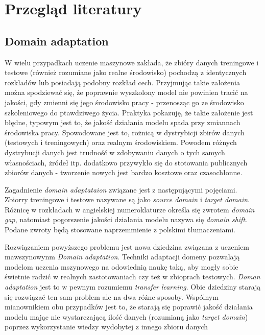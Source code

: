 
\chapter{Przegląd literatury}
    \justify    
    \section{Domain adaptation}
            W wielu przypadkach uczenie maszynowe zakłada, że zbióry danych treningowe i testowe (również rozumiane jako realne środowisko) pochodzą
        z identycznych rozkładów lub posiadają podobny rozkład cech. Przyjmując takie założenia można spodziewać się, że poprawnie wyszkolony model
        nie powinien tracić na jakości, gdy zmienni się jego środowisko pracy - przenosząc go ze środowisko szkoleniowego do ptawdziwego życia.
        Praktyka pokazuję, że takie założenie jest błędne, typowym jest to, że jakość działania modelu spada przy zmiannach środowiska pracy. 
        Spowodowane jest to, rożnicą w dystrybicji zbirów danych (testowych i treningowych) oraz realnym środowiskiem. Powodem różnych dystrybucji
        danych jest trudność w zdobywaniu danych o tych samych własnościach, żródeł itp. dodatkowo przywykło się do stotowania publicznych 
        zbiorów danych - tworzenie nowych jest bardzo kosztowe oraz czasochłonne\cite{domain_adaptation_review}.
        \par
            Zagadnienie \textit{domain adaptataion} związane jest z następującymi pojęciami. Zbiorry treningowe i testowe nazywane są jako 
        \textit{source domain} i \textit{target domain}. Różnicę w rozkładach w angielskiej numeroklaturze określa się zwrotem \textit{domain gap},
        natomiast pogorszenie jakości działania modelu nazywa się \textit{domain shift}. Podane zwroty będą stosowane naprzemmienie z polskimi 
        tłumaczeniami. 
        \par  
            Rozwiązaniem powyższego problemu jest nowa dziedzina związana z uczeniem mawszynowynm \textit{Domain adaptation}. Techniki adaptacji domeny
        pozwalają modelom uczenia mszynowego na odowiednią naukę taką, aby mogły sobie świetnie radzić w realnych zastotowaniach czy też w zbioprach 
        testowych. \textit{Doman adaptation} jest to w pewnym rozumiemu \textit{transfer learning}\cite{transfer_learning}. Obie dziedziny starają się
        rozwiązać ten sam problem ale na dwa różne sposoby. Wspólnym mianownikiem obu przypadków jest to, że starają się poprawić jakość działania modelu
        mając nie wystarczającą ilość danych (rozumianą jako \textit{target domain}) poprzez wykorzystanie wiedzy wydobytej z innego zbioru danych 
